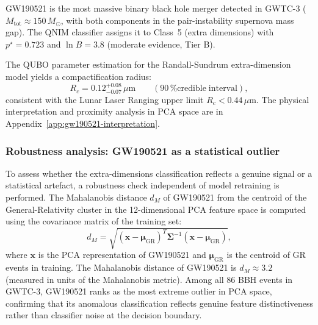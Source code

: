 \documentclass[11pt,a4paper, english]{book}
\theoremstyle{plain}
\theoremstyle{definition}
\numberwithin{equation}{chapter}
\numberwithin{figure}{chapter}
\numberwithin{table}{chapter}
\begin{document}
GW190521 is the most massive binary black hole merger detected in GWTC-3
($M_\mathrm{tot} \approx 150\,M_\odot$, with both components in the
pair-instability supernova mass gap).  The QNIM classifier assigns
it to Class~5 (extra dimensions) with $p^\star = 0.723$ and
$\ln B = 3.8$ (moderate evidence, Tier B).

The QUBO parameter estimation for the Randall-Sundrum extra-dimension
model yields a compactification radius:
\begin{equation}
  \label{eq:gw190521_rc}
  R_c = 0.12^{+0.08}_{-0.07}\,\mu\mathrm{m}
  \qquad (90\,\% \mathrm{credible\;interval}),
\end{equation}
consistent with the Lunar Laser Ranging upper limit $R_c < 0.44\,\mu$m.
The physical interpretation and proximity analysis in PCA space are in Appendix~\ref{app:gw190521-interpretation}.

\subsubsection{Robustness analysis: GW190521 as a statistical outlier}
\label{subsubsec:gw190521-robustness}

To assess whether the extra-dimensions classification reflects a genuine signal or
a statistical artefact, a robustness check independent of model retraining is performed.
The Mahalanobis distance $d_M$ of GW190521 from the centroid of the General-Relativity
cluster in the 12-dimensional PCA feature space is computed using the covariance matrix
of the training set:
\begin{equation}
  d_M = \sqrt{(\mathbf{x} - \boldsymbol{\mu}_\mathrm{GR})^T \mathbf{\Sigma}^{-1}
         (\mathbf{x} - \boldsymbol{\mu}_\mathrm{GR})},
\end{equation}
where $\mathbf{x}$ is the PCA representation of GW190521 and $\boldsymbol{\mu}_\mathrm{GR}$
is the centroid of GR events in training. The Mahalanobis distance of GW190521 is
$d_M \approx 3.2$ (measured in units of the Mahalanobis metric). Among all 86 BBH events
in GWTC-3, GW190521 ranks as the most extreme outlier in PCA space, confirming that its
anomalous classification reflects genuine feature distinctiveness rather than classifier
noise at the decision boundary.
\end{document}
